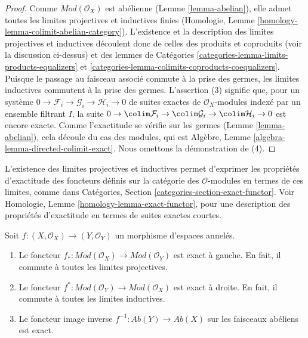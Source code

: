 \begin{proof}
Comme $\textit{Mod}(\mathcal{O}_X)$ est abélienne (Lemme
\ref{lemma-abelian}), elle admet toutes les limites projectives et inductives
finies (Homologie, Lemme \ref{homology-lemma-colimit-abelian-category}).
L'existence et la description des limites projectives et inductives découlent
donc de celles des produits et coproduits (voir la discussion ci-dessus) et
des lemmes de Catégories \ref{categories-lemma-limits-products-equalizers} et
\ref{categories-lemma-colimits-coproducts-coequalizers}. Puisque le passage au
faisceau associé commute à la prise des germes, les limites inductives
commutent à la prise des germes. L'assertion (3) signifie que, pour un système
$0 \to \mathcal{F}_i \to \mathcal{G}_i \to \mathcal{H}_i \to 0$ de suites
exactes de $\mathcal{O}_X$-modules indexé par un ensemble filtrant $I$, la
suite $0 \to \colim \mathcal{F}_i \to \colim \mathcal{G}_i \to
\colim \mathcal{H}_i \to 0$ est encore exacte. Comme l'exactitude se vérifie
sur les germes (Lemme \ref{lemma-abelian}), cela découle du cas des modules,
qui est Algèbre, Lemme \ref{algebra-lemma-directed-colimit-exact}. Nous
omettons la démonstration de (4).
\end{proof}

\noindent
L'existence des limites projectives et inductives permet d'exprimer les
propriétés d'exactitude des foncteurs définis sur la catégorie des
$\mathcal{O}$-modules en termes de ces limites, comme dans Catégories,
Section \ref{categories-section-exact-functor}. Voir Homologie, Lemme
\ref{homology-lemma-exact-functor}, pour une description des propriétés
d'exactitude en termes de suites exactes courtes.

\begin{lemma}
\label{lemma-exactness-pushforward-pullback}
Soit $f : (X, \mathcal{O}_X) \to (Y, \mathcal{O}_Y)$ un morphisme
d'espaces annelés.
\begin{enumerate}
\item Le foncteur
$f_* : \textit{Mod}(\mathcal{O}_X) \to \textit{Mod}(\mathcal{O}_Y)$
est exact à gauche. En fait, il commute à toutes les limites projectives.
\item Le foncteur
$f^* : \textit{Mod}(\mathcal{O}_Y) \to \textit{Mod}(\mathcal{O}_X)$
est exact à droite. En fait, il commute à toutes les limites inductives.
\item Le foncteur image inverse
$f^{-1} : \textit{Ab}(Y) \to \textit{Ab}(X)$ sur les faisceaux abéliens est
exact.
\end{enumerate}
\end{lemma}

